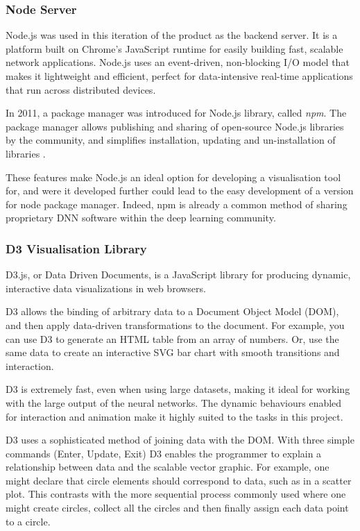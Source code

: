 \documentclass[a4paper,11pt,titlepage]{article}
\begin{document}
	\subsubsection{Node Server}
	Node.js was used in this iteration of the product as the backend server. It is a platform built on Chrome's JavaScript runtime for easily building fast, scalable network applications. Node.js uses an event-driven, non-blocking I/O model that makes it lightweight and efficient, perfect for data-intensive real-time applications that run across distributed devices.
		\par 
		In 2011, a package manager was introduced for Node.js library, called \textit{npm}. The package manager allows publishing and sharing of open-source Node.js libraries by the community, and simplifies installation, updating and un-installation of libraries \cite{Dahl2009}.
		\par 
		These features make Node.js an ideal option for developing a visualisation tool for, and were it developed further could lead to the easy development of a version for node package manager. Indeed, npm is already a common method of sharing proprietary DNN software within the deep learning community.
		 
		\subsubsection{D3 Visualisation Library}
		D3.js, or Data Driven Documents, is a JavaScript library for producing dynamic, interactive data visualizations in web browsers.
		\par 
		D3 allows the binding of arbitrary data to a Document Object Model (DOM), and then apply data-driven transformations to the document. For example, you can use D3 to generate an HTML table from an array of numbers. Or, use the same data to create an interactive SVG bar chart with smooth transitions and interaction\cite{Bostock2011a}.
		\par
		D3 is extremely fast, even when using large datasets, making it ideal for working with the large output of the neural networks. The dynamic behaviours enabled for interaction and animation make it highly suited to the tasks in this project.
		\par 
	D3 uses a sophisticated method of joining data with the DOM. With three simple commands (Enter, Update, Exit) D3 enables the programmer to explain a relationship between data and the scalable vector graphic. For example, one might declare that circle elements should correspond to data, such as in a scatter plot. This contrasts with the more sequential process commonly used where one might create circles, collect all the circles and then finally assign each data point to a circle.
	
\end{document}
